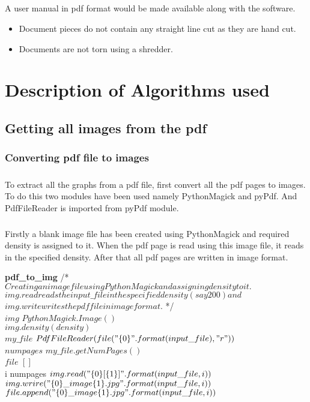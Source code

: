 \documentclass[a4paper,10pt]{scrreprt}
\begin{document}
\paragraph{}
A user manual in pdf format would be made available along with the software.
\begin{itemize}
   \item Document pieces do not contain any straight line cut as they are hand cut.
   \item Documents are not torn using a shredder.
\end{itemize}

\chapter{Description of Algorithms used}

\section{Getting all images from the pdf}
\subsection{Converting pdf file to images}
\paragraph{}
To extract all the graphs from a pdf file, first convert all the pdf pages to images. To do this two modules have been used namely PythonMagick and pyPdf. And PdfFileReader is imported from pyPdf module.
\paragraph{}
Firstly a blank image file has been created using PythonMagick and required density is assigned to it. When the pdf page is read using this image file, it reads in the specified density. After that all pdf pages are written in image format.
\\
\begin{pseudocode}{\textbf{pdf_to_img}}{ }
/\mbox{*}$ Creating an image file using PythonMagick and assigning density to it.$\\ $img.read reads the input\_file in the specified density(say 200) and $\\$img.write writes the pdf file in image format. $ \mbox{*}/\\
$img $ \GETS $ PythonMagick.Image() $\\
$img.density(density) $\\
$my\_file $ \GETS $ PdfFileReader(file("\{0\}".format(input\_file),"r")) $\\
$numpages $ \GETS $ my\_file.getNumPages() $\\
$file $ \GETS $ [ ] $\\ 
\FOR i  \TO numpages \DO
\BEGIN
$img.read("\{0\}[\{1\}]".format(input\_file,i))$\\
$img.wrire("\{0\}\_image\{1\}.jpg".format(input\_file,i))$\\
$file.append("\{0\}\_image\{1\}.jpg".format(input\_file,i))$\\
\END\\
\end{pseudocode}
\end{document}
